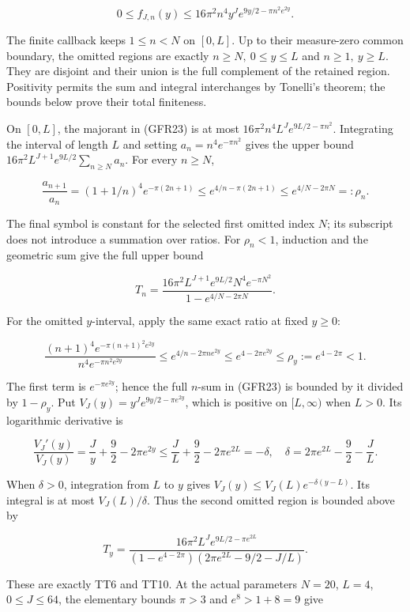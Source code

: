 \[
0\le f_{J,n}(y)
\le16\pi^2n^4 y^J e^{9y/2-\pi n^2e^{2y}}.
\tag{GFR23}
\]

The finite callback keeps \(1\le n<N\) on \([0,L]\). Up to their measure-zero common boundary, the omitted regions are exactly \(n\ge N,\ 0\le y\le L\) and \(n\ge1,\ y\ge L\). They are disjoint and their union is the full complement of the retained region. Positivity permits the sum and integral interchanges by Tonelli's theorem; the bounds below prove their total finiteness.

On \([0,L]\), the majorant in (GFR23) is at most \(16\pi^2n^4 L^J e^{9L/2-\pi n^2}\). Integrating the interval of length \(L\) and setting \(a_n=n^4e^{-\pi n^2}\) gives the upper bound \(16\pi^2L^{J+1}e^{9L/2}\sum_{n\ge N}a_n\). For every \(n\ge N\),

\[
\frac{a_{n+1}}{a_n}
=(1+1/n)^4e^{-\pi(2n+1)}
\le e^{4/n-\pi(2n+1)}
\le e^{4/N-2\pi N}=:\rho_n.
\tag{GFR24}
\]

The final symbol is constant for the selected first omitted index \(N\); its subscript does not introduce a summation over ratios. For \(\rho_n<1\), induction and the geometric sum give the full upper bound

\[
T_n=\frac{16\pi^2L^{J+1}e^{9L/2}N^4e^{-\pi N^2}}
 {1-e^{4/N-2\pi N}}.
\tag{GFR25}
\]

For the omitted \(y\)-interval, apply the same exact ratio at fixed \(y\ge0\):

\[
\frac{(n+1)^4e^{-\pi(n+1)^2e^{2y}}}{n^4e^{-\pi n^2e^{2y}}}
\le e^{4/n-2\pi n e^{2y}}
\le e^{4-2\pi e^{2y}}
\le\rho_y:=e^{4-2\pi}<1.
\tag{GFR26}
\]

The first term is \(e^{-\pi e^{2y}}\); hence the full \(n\)-sum in (GFR23) is bounded by it divided by \(1-\rho_y\). Put \(V_J(y)=y^Je^{9y/2-\pi e^{2y}}\), which is positive on \([L,\infty)\) when \(L>0\). Its logarithmic derivative is

\[
\frac{V_J'(y)}{V_J(y)}
=\frac Jy+\frac92-2\pi e^{2y}
\le\frac JL+\frac92-2\pi e^{2L}
=-\delta,\quad
\delta=2\pi e^{2L}-\frac92-\frac JL.
\tag{GFR27}
\]

When \(\delta>0\), integration from \(L\) to \(y\) gives \(V_J(y)\le V_J(L)e^{-\delta(y-L)}\). Its integral is at most \(V_J(L)/\delta\). Thus the second omitted region is bounded above by

\[
T_y=\frac{16\pi^2L^J e^{9L/2-\pi e^{2L}}}
 {(1-e^{4-2\pi})(2\pi e^{2L}-9/2-J/L)}.
\tag{GFR28}
\]

These are exactly TT6 and TT10. At the actual parameters \(N=20\), \(L=4\), \(0\le J\le64\), the elementary bounds \(\pi>3\) and \(e^8>1+8=9\) give


